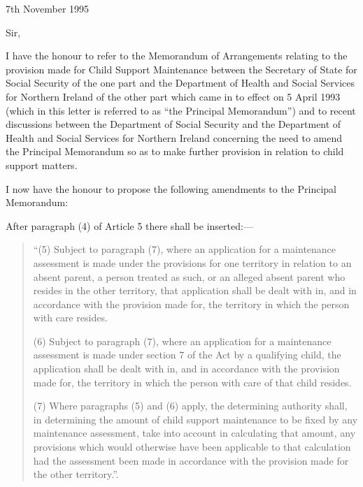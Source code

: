 \documentclass[12pt,a4paper]{article}
\begin{document}
7th November 1995

  Sir,

  I have the honour to refer to the Memorandum of Arrangements relating to the provision made for Child Support Maintenance between the Secretary of State for Social Security of the one part and the Department of Health and Social Services for Northern Ireland of the other part which came in to effect on 5 April 1993 (which in this letter is referred to as “the Principal Memorandum”) and to recent discussions between the Department of Social Security and the Department of Health and Social Services for Northern Ireland concerning the need to amend the Principal Memorandum so as to make further provision in relation to child support matters.

  I now have the honour to propose the following amendments to the Principal Memorandum:

  After paragraph (4) of Article 5 there shall be inserted:—
\begin{quotation}
 “(5) Subject to paragraph (7), where an application for a maintenance assessment is made under the provisions for one territory in relation to an absent parent, a person treated as such, or an alleged absent parent who resides in the other territory, that application shall be dealt with in, and in accordance with the provision made for, the territory in which the person with care resides.

(6) Subject to paragraph (7), where an application for a maintenance assessment is made under section 7 of the Act by a qualifying child, the application shall be dealt with in, and in accordance with the provision made for, the territory in which the person with care of that child resides.

(7) Where paragraphs (5) and (6) apply, the determining authority shall, in determining the amount of child support maintenance to be fixed by any maintenance assessment, take into account in calculating that amount, any provisions which would otherwise have been applicable to that calculation had the assessment been made in accordance with the provision made for the other territory.”.
\end{quotation}
\end{document}
